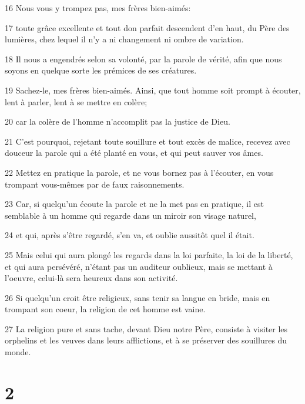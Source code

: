 \par 16 Nous vous y trompez pas, mes frères bien-aimés:
\par 17 toute grâce excellente et tout don parfait descendent d'en haut, du Père des lumières, chez lequel il n'y a ni changement ni ombre de variation.
\par 18 Il nous a engendrés selon sa volonté, par la parole de vérité, afin que nous soyons en quelque sorte les prémices de ses créatures.
\par 19 Sachez-le, mes frères bien-aimés. Ainsi, que tout homme soit prompt à écouter, lent à parler, lent à se mettre en colère;
\par 20 car la colère de l'homme n'accomplit pas la justice de Dieu.
\par 21 C'est pourquoi, rejetant toute souillure et tout excès de malice, recevez avec douceur la parole qui a été planté en vous, et qui peut sauver vos âmes.
\par 22 Mettez en pratique la parole, et ne vous bornez pas à l'écouter, en vous trompant vous-mêmes par de faux raisonnements.
\par 23 Car, si quelqu'un écoute la parole et ne la met pas en pratique, il est semblable à un homme qui regarde dans un miroir son visage naturel,
\par 24 et qui, après s'être regardé, s'en va, et oublie aussitôt quel il était.
\par 25 Mais celui qui aura plongé les regards dans la loi parfaite, la loi de la liberté, et qui aura persévéré, n'étant pas un auditeur oublieux, mais se mettant à l'oeuvre, celui-là sera heureux dans son activité.
\par 26 Si quelqu'un croit être religieux, sans tenir sa langue en bride, mais en trompant son coeur, la religion de cet homme est vaine.
\par 27 La religion pure et sans tache, devant Dieu notre Père, consiste à visiter les orphelins et les veuves dans leurs afflictions, et à se préserver des souillures du monde.

\chapter{2}

